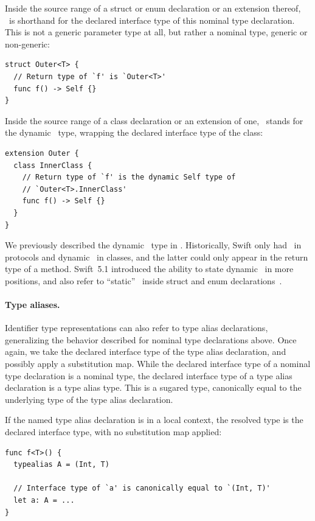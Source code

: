 \documentclass[../generics]{subfiles}
\begin{document}
Inside the source range of a struct or enum declaration or an extension thereof, \tSelf\ is shorthand for the declared interface type of this nominal type declaration. This is not a generic parameter type at all, but rather a nominal type, generic or non-generic:
\begin{Verbatim}
struct Outer<T> {
  // Return type of `f' is `Outer<T>'
  func f() -> Self {}
}
\end{Verbatim}

Inside the source range of a class declaration or an extension of one, \tSelf\ stands for the dynamic \tSelf\ type, wrapping the declared interface type of the class:
\begin{Verbatim}
extension Outer {
  class InnerClass {
    // Return type of `f' is the dynamic Self type of
    // `Outer<T>.InnerClass'
    func f() -> Self {}
  }
}
\end{Verbatim}

We previously described the dynamic \tSelf\ type in . Historically, Swift only had \tSelf\ in protocols and dynamic \tSelf\ in classes, and the latter could only appear in the return type of a method. Swift~5.1 introduced the ability to state dynamic \tSelf\ in more positions, and also refer to ``static'' \tSelf\ inside struct and enum declarations~\cite{se0068}.

\paragraph{Type aliases.}
Identifier type representations can also refer to type alias declarations, generalizing the behavior described for nominal type declarations above. Once again, we take the declared interface type of the type alias declaration, and possibly apply a substitution map. While the declared interface type of a nominal type declaration is a nominal type, the declared interface type of a type alias declaration is a type alias type. This is a sugared type, canonically equal to the underlying type of the type alias declaration.

If the named type alias declaration is in a local context, the resolved type is the declared interface type, with no substitution map applied:
\begin{Verbatim}
func f<T>() {
  typealias A = (Int, T)

  // Interface type of `a' is canonically equal to `(Int, T)'
  let a: A = ...
}
\end{Verbatim}
\end{document}
